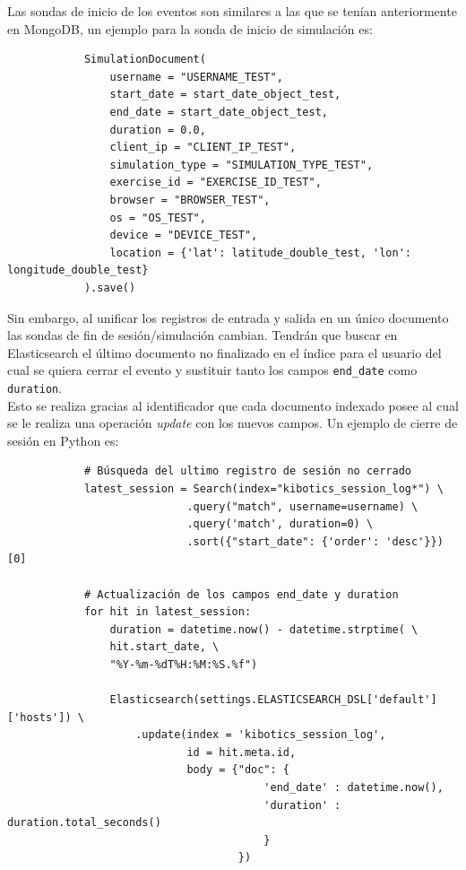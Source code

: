 \documentclass[a4paper, 12pt]{book}
\begin{document}
		Las sondas de inicio de los eventos son similares a las que se tenían anteriormente en MongoDB, un ejemplo para la sonda de inicio de simulación es:
		
		{\footnotesize
		\begin{verbatim}
			SimulationDocument(
			    username = "USERNAME_TEST",
			    start_date = start_date_object_test,
			    end_date = start_date_object_test,
			    duration = 0.0,
			    client_ip = "CLIENT_IP_TEST",
			    simulation_type = "SIMULATION_TYPE_TEST",
			    exercise_id = "EXERCISE_ID_TEST",
			    browser = "BROWSER_TEST",
			    os = "OS_TEST",
			    device = "DEVICE_TEST",
			    location = {'lat': latitude_double_test, 'lon': longitude_double_test}
			).save()
		\end{verbatim}
		}
	
		Sin embargo, al unificar los registros de entrada y salida en un único documento las sondas de fin de sesión/simulación cambian. Tendrán que buscar en Elasticsearch el último documento no finalizado en el índice para el usuario del cual se quiera cerrar el evento y sustituir tanto los campos \texttt{end\_date} como \texttt{duration}. \\
		
		Esto se realiza gracias al identificador que cada documento indexado posee al cual se le realiza una operación \textit{update} con los nuevos campos. Un ejemplo de cierre de sesión en Python es:
		
		
		{\footnotesize
		\begin{verbatim}
			# Búsqueda del ultimo registro de sesión no cerrado
			latest_session = Search(index="kibotics_session_log*") \
			                .query("match", username=username) \
			                .query('match', duration=0) \
			                .sort({"start_date": {'order': 'desc'}})[0]
			
			# Actualización de los campos end_date y duration
			for hit in latest_session:
			    duration = datetime.now() - datetime.strptime( \
			    hit.start_date, \
			    "%Y-%m-%dT%H:%M:%S.%f")
			
			    Elasticsearch(settings.ELASTICSEARCH_DSL['default']['hosts']) \
			        .update(index = 'kibotics_session_log', 
			                id = hit.meta.id,
			                body = {"doc": {
			                            'end_date' : datetime.now(), 
			                            'duration' : duration.total_seconds()
			                            }
			                        })
		\end{verbatim}
		}
	
\end{document}
